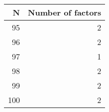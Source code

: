 \begin{tabular}{rr}
\toprule
   N &  Number of factors \\
\midrule
  95 &                  2 \\
  96 &                  2 \\
  97 &                  1 \\
  98 &                  2 \\
  99 &                  2 \\
 100 &                  2 \\
\bottomrule
\end{tabular}
